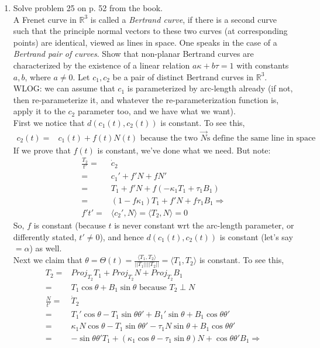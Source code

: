 \documentclass[12pt]{amsart}
\newcommand{\q}[1]{\item #1}
\begin{document}
\begin{enumerate}
\newpage
\q{Solve problem 25 on p. 52 from the book.\\A Frenet curve in $\mathbb{R}^3$ is called a \emph{Bertrand curve}, if there is a second curve such that the principle normal vectors to these two curves (at corresponding points) are identical, viewed as lines in space. One speaks in the case of a \emph{Bertrand pair of curves}. Show that non-planar Bertrand curves are characterized by the existence of a linear relation $a\kappa+b\tau=1$ with constants $a,b$, where $a\neq0$.}
Let $c_1,c_2$ be a pair of distinct Bertrand curves in $\mathbb{R}^3$. WLOG: we can assume that $c_1$ is parameterized by arc-length already (if not, then re-parameterize it, and whatever the re-parameterization function is, apply it to the $c_2$ parameter too, and we have what we want).
\\First we notice that $d(c_1(t),c_2(t))$ is constant. To see this,
\begin{align*}
	c_2(t)=&c_1(t)+f(t)N(t) \text{ because the two $\vec N$s define the same line in space}
\end{align*}
If we prove that $f(t)$ is constant, we've done what we need. But note:
\begin{align*}
	\frac{T_2}{t'}=&\dot c_2
	\\=&c_1'+f'N+fN'
	\\=&T_1+f'N+f(-\kappa_1T_1+\tau_1B_1)
	\\=&(1-f\kappa_1)T_1+f'N+f\tau_1B_1 \Rightarrow
	\\f't'=&\langle c_2',N\rangle=\langle T_2,N\rangle=0
\end{align*}
So, $f$ is constant (because $t$ is never constant wrt the arc-length parameter, or differently stated, $t'\neq0$), and hence $d(c_1(t),c_2(t))$ is constant (let's say $=\alpha$) as well.
\\Next we claim that $\theta=\Theta(t)=\frac{\langle T_1,T_2\rangle}{||T_1||||T_2||}=\langle T_1,T_2\rangle$ is constant. To see this,
\begin{align*}
	T_2=&Proj_{T_2}T_1+Proj_{T_2}N+Proj_{T_2}B_1
	\\=&T_1\cos\theta+B_1\sin\theta \text{ because $T_2\perp N$}
	\\\frac{N}{t'}=&\dot T_2
	\\=&T_1'\cos\theta-T_1\sin\theta\theta'+B_1'\sin\theta+B_1\cos\theta\theta'
	\\=&\kappa_1N\cos\theta-T_1\sin\theta\theta'-\tau_1N\sin\theta+B_1\cos\theta\theta'
	\\=&-\sin\theta\theta'T_1+(\kappa_1\cos\theta-\tau_1\sin\theta)N+\cos\theta\theta'B_1\Rightarrow

\end{align*}
\end{enumerate}
\end{document}
